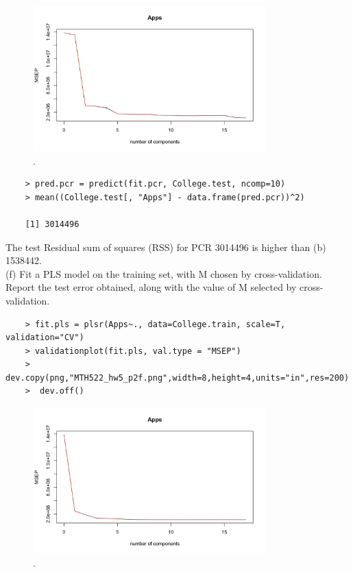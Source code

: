 \documentclass{article}
\begin{document}
\begin{figure}[htb]
	\begin{center}
		\includegraphics[width=0.8\textwidth]{MTH522_hw5_p2e.png}
	\end{center}
	\caption{.}
	\label{fig:MTH522_hw5_p2e}
\end{figure}

\newpage

\begin{program}
	\begin{verbatim}
	> pred.pcr = predict(fit.pcr, College.test, ncomp=10)
	> mean((College.test[, "Apps"] - data.frame(pred.pcr))^2)
	
	[1] 3014496
	\end{verbatim}
\end{program}
The test Residual sum of squares (RSS) for PCR 3014496  is higher than (b) 1538442.\\

(f) Fit a PLS model on the training set, with M chosen by cross-validation. Report the test error obtained, along with the value of M selected by cross-validation.\\

\begin{program}
	\begin{verbatim}
	> fit.pls = plsr(Apps~., data=College.train, scale=T, validation="CV")
	> validationplot(fit.pls, val.type = "MSEP")
	> dev.copy(png,"MTH522_hw5_p2f.png",width=8,height=4,units="in",res=200)
	>  dev.off()
	\end{verbatim}
\end{program}


\begin{figure}[htb]
	\begin{center}
		\includegraphics[width=0.8\textwidth]{MTH522_hw5_p2f.png}
	\end{center}
	\caption{.}
	\label{fig:MTH522_hw5_p2f}
\end{figure}
\end{document}
